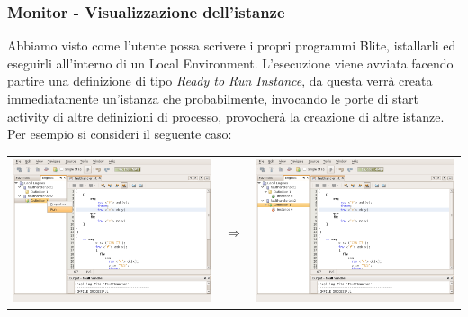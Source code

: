 \subsubsection*{Monitor - Visualizzazione dell'istanze}

Abbiamo visto come l'utente possa scrivere i propri programmi Blite, istallarli
ed eseguirli all'interno di un Local Environment. L'esecuzione viene avviata
facendo partire una definizione di tipo \emph{Ready to Run Instance}, da
questa verrà creata immediatamente un'istanza che probabilmente, invocando le
porte di start activity di altre definizioni di processo, provocherà la
creazione di altre istanze. Per esempio si consideri il seguente caso:

\vspace{0.5cm}

\begin{center}
\begin{tabular}{ccc}
\includegraphics[scale=0.75]{blide/dia/BlideMon1} 
& $\Rightarrow$
& \includegraphics[scale=0.75]{blide/dia/BlideMon2}    
\end{tabular}
\end{center}
